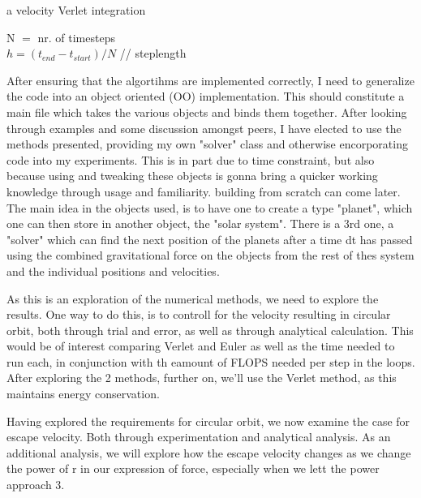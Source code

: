 \documentclass[10pt, twocolumn]{revtex4-1}
\begin{document}
\begin{algorithm}
    \caption{a velocity Verlet integration}
    N $=$ nr. of timesteps \\
    $h = (t_{end} - t_{start})/N $ // steplength \\
\end{algorithm}

After ensuring that the algortihms are implemented correctly, I need to generalize the code into an object oriented (OO)
implementation. This should constitute a main file which takes the various objects and binds them together. After looking
through examples and some discussion amongst peers, I have elected to use the methods presented, providing my own "solver" class
and otherwise encorporating code into my experiments. This is in part due to time constraint, but also because using and tweaking
these objects is gonna bring a quicker working knowledge through usage and familiarity. building from scratch can come later.
The main idea in the objects used, is to have one to create a type "planet", which one can then store in another object, the 
"solar system". There is a 3rd one, a "solver" which can find the next position of the planets after a time dt has passed using
the combined gravitational force on the objects from the rest of thes system and the individual positions and velocities. 

As this is an exploration of the numerical methods, we need to explore the results. One way to do this, is to controll for the 
velocity resulting in circular orbit, both through trial and error, as well as through analytical calculation. This would be of interest
comparing Verlet and Euler as well as the time needed to run each, in conjunction with th eamount of FLOPS needed per step in the loops. 
After exploring the 2 methods, further on, we'll use the Verlet method, as this maintains energy conservation. 

Having explored the requirements for circular orbit, we now examine the case for escape velocity. Both through experimentation and analytical analysis. 
As an additional analysis, we will explore how the escape velocity changes as we change the power of r in our expression of force, especially when we lett 
the power approach 3. 
\end{document}
